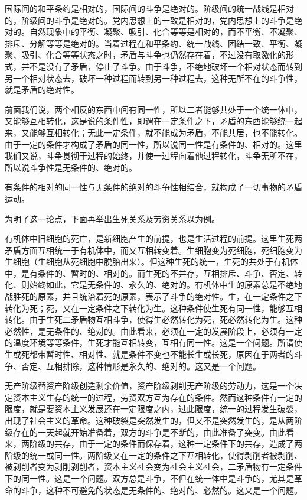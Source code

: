\documentclass[UTF8, 12pt, a4paper]{ctexrep}
\begin{document}
国际间的和平条约是相对的，国际间的斗争是绝对的。阶级间的统一战线是相对的，阶级间的斗争是绝对的。党内思想上的一致是相对的，党内思想上的斗争是绝对的。自然现象中的平衡、凝聚、吸引、化合等等是相对的，而不平衡、不凝聚、排斥、分解等等是绝对的。当着过程在和平条约、统一战线、团结一致、平衡、凝聚、吸引、化合等等状态之时，矛盾与斗争也仍然存在着，不过没有取激化的形式，并不是没有了矛盾，停止了斗争。由于斗争，不绝地破坏一个相对状态而转到另一个相对状态去，破坏一种过程而转到另一种过程去，这种无所不在的斗争性，就是矛盾的绝对性。

前面我们说，两个相反的东西中间有同一性，所以二者能够共处于一个统一体中，又能够互相转化，这是说的条件性，即谓在一定条件之下，矛盾的东西能够统一起来，又能够互相转化；无此一定条件，就不能成为矛盾，不能共居，也不能转化。由于一定的条件才构成了矛盾的同一性，所以说同一性是有条件的、相对的。这里我们又说，斗争贯彻于过程的始终，并使一过程向着他过程转化，斗争无所不在，所以说斗争性是无条件的、绝对的。

有条件的相对的同一性与无条件的绝对的斗争性相结合，就构成了一切事物的矛盾运动。

为明了这一论点，下面再举出生死关系及劳资关系以为例。

有机体中旧细胞的死亡，是新细胞产生的前提，也是生活过程的前提。这里生死两矛盾方面互相统一于有机体中，而又互相转变着。生细胞变为死细胞，死细胞变为生细胞（生细胞从死细胞中脱胎出来）。但这种生死的统一，生死的共处于有机体中，是有条件的、暂时的、相对的。而生死的不并存，互相排斥、斗争、否定、转化、则始终如此，它是无条件的、永久的、绝对的。有机体中生的原素总是不绝地战胜死的原素，并且统治着死的原素，表示了斗争的绝对性。生，在一定条件之下转化为死；死，又在一定条件之下转化为生。这种条件使生死有同一性，能够互相转化。由于生死二矛盾物互相斗争，使得生必然转化为死，死必然转化为生。这种必然性，是无条件的、绝对的。由此看来，必须在一定的发展阶段上，必须有一定的温度环境等等条件，生死才能互相转变，互相有同一性。这是一个问题。所谓使生或死都带暂时性、相对性、就是条件不变也不能长生或长死，原因在于两者的斗争、否定、互相排除，这种情形是永久的、绝对的。这又是一个问题。

无产阶级替资产阶级创造剩余价值，资产阶级剥削无产阶级的劳动力，这是一个决定资本主义生存的统一的过程，劳资双方互为存在的条件。然而这种条件有一定的限度，就是要资本主义发展还在一定限度之内，过此限度，统一的过程发生破裂，出现了社会主义的革命。这种破裂是突然发生的，但又不是突然发生的，是从两阶级存在的一天起就开始准备着，双方的斗争是不断的，由此准备了突变。由此看来，两阶级的共存，由于一定的条件而保存着，这种一定条件下的共存，造成了两阶级的统一或同一性。两阶级又在一定的条件之下互相转化，使得剥削者被剥削、被剥削者变为剥削剥削者，资本主义社会变为社会主义社会，二矛盾物有一定条件下的同一性。这是一个问题。双方总是斗争，不但在统一体中是斗争的，尤其是革命的斗争，这种不可避免的状态是无条件的、绝对的、必然的。这又是一个问题。
\end{document}
